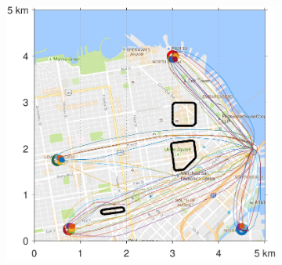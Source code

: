 \begin{figure}[!htb]
\begin{subfigure}{0.5\textwidth}
  \includegraphics[width=\columnwidth]{figs/sf_d11sep0}
  \label{fig:sf_d11sep0}
\end{subfigure}%


\end{figure}
